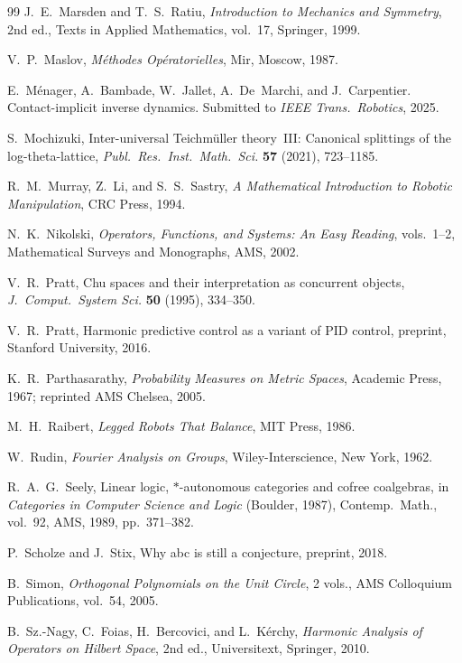 \begin{thebibliography}{99}
J.~E.~Marsden and T.~S.~Ratiu,
\emph{Introduction to Mechanics and Symmetry}, 2nd ed.,
Texts in Applied Mathematics, vol.~17, Springer, 1999.

V.~P.~Maslov,
\emph{M\'ethodes Op\'eratorielles},
Mir, Moscow, 1987.

E.~M\'enager, A.~Bambade, W.~Jallet, A.~De~Marchi, and J.~Carpentier.
\newblock Contact-implicit inverse dynamics.
\newblock Submitted to \emph{IEEE Trans.\ Robotics}, 2025.

S.~Mochizuki,
Inter-universal Teichm\"uller theory~III: Canonical splittings of the log-theta-lattice,
\emph{Publ.\ Res.\ Inst.\ Math.\ Sci.} \textbf{57} (2021), 723--1185.

R.~M.~Murray, Z.~Li, and S.~S.~Sastry,
\emph{A Mathematical Introduction to Robotic Manipulation},
CRC Press, 1994.

N.~K.~Nikolski,
\emph{Operators, Functions, and Systems: An Easy Reading}, vols.~1--2,
Mathematical Surveys and Monographs, AMS, 2002.

V.~R.~Pratt,
Chu spaces and their interpretation as concurrent objects,
\emph{J.\ Comput.\ System Sci.} \textbf{50} (1995), 334--350.

V.~R.~Pratt,
Harmonic predictive control as a variant of {PID} control,
preprint, Stanford University, 2016.

K.~R.~Parthasarathy,
\emph{Probability Measures on Metric Spaces},
Academic Press, 1967; reprinted AMS Chelsea, 2005.

M.~H.~Raibert,
\emph{Legged Robots That Balance},
MIT Press, 1986.

W.~Rudin,
\emph{Fourier Analysis on Groups},
Wiley-Interscience, New York, 1962.

R.~A.~G.~Seely,
Linear logic, $*$-autonomous categories and cofree coalgebras,
in \emph{Categories in Computer Science and Logic} (Boulder, 1987),
Contemp.\ Math., vol.~92, AMS, 1989, pp.~371--382.

P.~Scholze and J.~Stix,
Why abc is still a conjecture,
preprint, 2018.

B.~Simon,
\emph{Orthogonal Polynomials on the Unit Circle}, 2 vols.,
AMS Colloquium Publications, vol.~54, 2005.

B.~Sz.-Nagy, C.~Foias, H.~Bercovici, and L.~K\'erchy,
\emph{Harmonic Analysis of Operators on Hilbert Space}, 2nd ed.,
Universitext, Springer, 2010.


\end{thebibliography}
